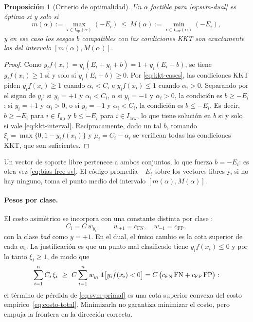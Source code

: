 \documentclass[11pt,a4paper]{article}
\newcommand{\bad}{\emph{bad}}
\theoremstyle{plain}
\newtheorem{proposicion}[teorema]{Proposición}
\theoremstyle{definition}
\theoremstyle{remark}
\numberwithin{equation}{section}
\begin{document}
\begin{proposicion}[Criterio de optimalidad]\label{prop:kkt}
Un $\alpha$ factible para \eqref{eq:svm-dual} es óptimo si y solo si
\begin{equation}\label{eq:kkt-interval}
  m(\alpha):=\max_{i\in I_{\mathrm{up}}(\alpha)}(-E_i)\ \le\
  M(\alpha):=\min_{i\in I_{\mathrm{low}}(\alpha)}(-E_i),
\end{equation}
y en ese caso los sesgos $b$ compatibles con las condiciones KKT son exactamente los del
intervalo $[m(\alpha),M(\alpha)]$.
\end{proposicion}
\begin{proof}
Como $y_if(x_i)=y_i(E_i+y_i+b)=1+y_i(E_i+b)$, se tiene $y_if(x_i)\ge1$ si y solo si
$y_i(E_i+b)\ge0$. Por \eqref{eq:kkt-cases}, las condiciones KKT piden $y_if(x_i)\ge1$ cuando
$\alpha_i<C_i$ e $y_if(x_i)\le1$ cuando $\alpha_i>0$. Separando por el signo de $y_i$:
si $y_i=+1$ y $\alpha_i<C_i$, o si $y_i=-1$ y $\alpha_i>0$, la condición es $b\ge-E_i$;
si $y_i=+1$ y $\alpha_i>0$, o si $y_i=-1$ y $\alpha_i<C_i$, la condición es $b\le-E_i$. Es
decir, $b\ge-E_i$ para $i\in I_{\mathrm{up}}$ y $b\le-E_i$ para $i\in I_{\mathrm{low}}$, lo
que tiene solución en $b$ si y solo si vale \eqref{eq:kkt-interval}. Recíprocamente, dado un
tal $b$, tomando $\xi_i=\max\{0,1-y_if(x_i)\}$ y $\mu_i=C_i-\alpha_i$ se verifican todas las
condiciones KKT, que son suficientes.
\end{proof}

Un vector de soporte libre pertenece a ambos conjuntos, lo que fuerza $b=-E_i$: es otra vez
\eqref{eq:bias-free-sv}. El código promedia $-E_i$ sobre los vectores libres y, si no hay
ninguno, toma el punto medio del intervalo $[m(\alpha),M(\alpha)]$.

\paragraph{Pesos por clase.} El costo asimétrico se incorpora con una constante distinta por
clase \cite{veropoulos1999}:
\begin{equation}\label{eq:class-weights}
  C_i=C\,w_{y_i},\qquad w_{+1}=c_{\mathrm{FN}},\quad w_{-1}=c_{\mathrm{FP}},
\end{equation}
con la clase \bad{} como $y=+1$. En el dual, el único cambio es la cota superior de cada
$\alpha_i$. La justificación es que un punto mal clasificado tiene $y_if(x_i)\le0$ y por lo
tanto $\xi_i\ge1$, de modo que
\begin{equation}\label{eq:weighted-hinge-bound}
  \sum_{i=1}^nC_i\,\xi_i\ \ge\ C\sum_{i=1}^nw_{y_i}\,\ones\bigl[y_if(x_i)<0\bigr]
  =C\,\bigl(c_{\mathrm{FN}}\,\mathrm{FN}+c_{\mathrm{FP}}\,\mathrm{FP}\bigr):
\end{equation}
el término de pérdida de \eqref{eq:svm-primal} es una cota superior convexa del costo
empírico~\eqref{eq:costo-total}. Minimizarla no garantiza minimizar el costo, pero empuja la
frontera en la dirección correcta.
\end{document}
